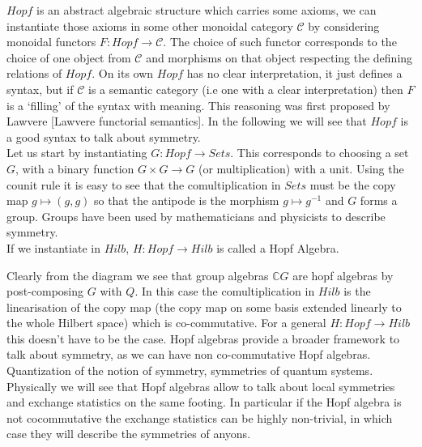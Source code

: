 \documentclass{article}
\begin{document}
$Hopf$ is an abstract algebraic structure which carries some axioms, we can instantiate those axioms in some other monoidal category $\mathcal{C}$ by considering monoidal functors $F: Hopf \rightarrow \mathcal{C}$.  The choice of such functor corresponds to the choice of one object from $\mathcal{C}$ and morphisms on that object respecting the defining relations of $Hopf$. On its own $Hopf$ has no clear interpretation, it just defines a syntax, but if $\mathcal{C}$ is a semantic category (i.e one with a clear interpretation) then $F$ is a `filling' of the syntax with meaning. This reasoning was first proposed by Lawvere [Lawvere functorial semantics]. In the following we will see that $Hopf$ is a good syntax to talk about symmetry. \\
Let us start by  instantiating $G: Hopf \rightarrow Sets$. This corresponds to choosing a set $G$, with a binary function $G \times G \rightarrow G$ (or multiplication) with a unit. Using the counit rule it is easy to see that the comultiplication in $Sets$ must be the copy map $g \mapsto (g,g)$ so that the antipode is the morphism $g \mapsto g^{-1}$ and $G$ forms a group. Groups have been used by mathematicians and physicists to describe symmetry. \\
If we instantiate in $Hilb$, $H:Hopf \rightarrow Hilb$ is called a Hopf Algebra.
\begin{center}
\end{center}
Clearly from the diagram we see that group algebras $\mathbb{C}G$ are hopf algebras by post-composing $G$ with $Q$. In this case the comultiplication in $Hilb$ is the linearisation of the copy map (the copy map on some basis extended linearly to the whole Hilbert space) which is co-commutative. For a general $H:Hopf \rightarrow Hilb$ this doesn't have to be the case. Hopf algebras provide a broader framework to talk about symmetry, as we can have non co-commutative Hopf algebras. Quantization of the notion of symmetry, symmetries of quantum systems. Physically we will see that Hopf algebras allow to talk about local symmetries and exchange statistics on the same footing. In particular if the Hopf algebra is not cocommutative the exchange statistics can be highly non-trivial, in which case they will describe the symmetries of anyons.\\
\end{document}
